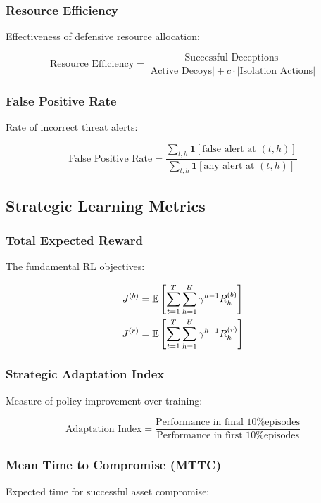 \documentclass[12pt,twoside]{article}
\theoremstyle{definition}
\theoremstyle{plain}
\begin{document}
\subsubsection{Resource Efficiency}
Effectiveness of defensive resource allocation:

\begin{equation}
\text{Resource Efficiency} = \frac{\text{Successful Deceptions}}{|\text{Active Decoys}| + c \cdot |\text{Isolation Actions}|}
\end{equation}

\subsubsection{False Positive Rate}
Rate of incorrect threat alerts:

\begin{equation}
\text{False Positive Rate} = \frac{\sum_{t,h} \mathbf{1}[\text{false alert at } (t,h)]}{\sum_{t,h} \mathbf{1}[\text{any alert at } (t,h)]}
\end{equation}

\subsection{Strategic Learning Metrics}

\subsubsection{Total Expected Reward}
The fundamental RL objectives:

\begin{align}
J^{(b)} &= \mathbb{E}\left[\sum_{t=1}^{T} \sum_{h=1}^{H} \gamma^{h-1} R_h^{(b)}\right] \\
J^{(r)} &= \mathbb{E}\left[\sum_{t=1}^{T} \sum_{h=1}^{H} \gamma^{h-1} R_h^{(r)}\right]
\end{align}

\subsubsection{Strategic Adaptation Index}
Measure of policy improvement over training:

\begin{equation}
\text{Adaptation Index} = \frac{\text{Performance in final 10\% episodes}}{\text{Performance in first 10\% episodes}}
\end{equation}

\subsubsection{Mean Time to Compromise (MTTC)}
Expected time for successful asset compromise:
\end{document}
